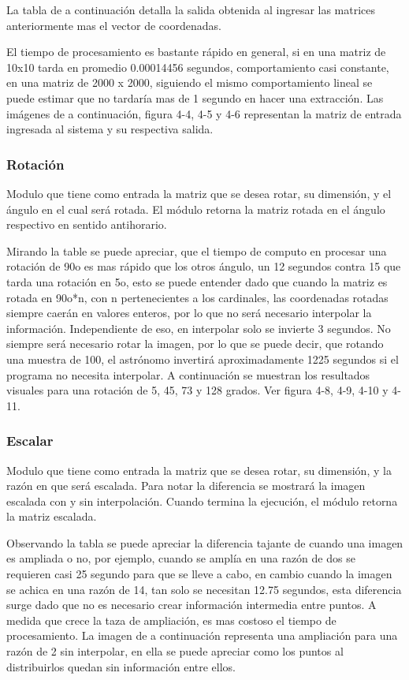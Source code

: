 La tabla de a continuación detalla la salida obtenida al ingresar las matrices
anteriormente mas el vector de coordenadas.

El tiempo de procesamiento es bastante rápido en general, si en una matriz de
10x10
tarda en promedio 0.00014456 segundos, comportamiento casi constante, en una
matriz
de 2000 x 2000, siguiendo el mismo comportamiento lineal se puede estimar que no
tardaría mas de 1 segundo en hacer una extracción.
Las imágenes de a continuación, figura 4-4, 4-5 y 4-6 representan la matriz de
entrada
ingresada al sistema y su respectiva salida.

\subsubsection{Rotación}

Modulo que tiene como entrada la matriz que se desea rotar, su dimensión, y el
ángulo en el cual será rotada. El módulo retorna la matriz rotada en el ángulo
respectivo en sentido antihorario.

Mirando la table se puede apreciar, que el tiempo de computo en procesar una
rotación de 90o es mas rápido que los otros ángulo, un 12 segundos contra 15 que
tarda una rotación en 5o, esto se puede entender dado que cuando la matriz es
rotada en 90o*n, con n pertenecientes a los cardinales, las coordenadas rotadas
siempre caerán en valores enteros, por lo que no será necesario interpolar la
información. Independiente de eso, en interpolar solo se invierte 3 segundos. No
siempre será necesario rotar la imagen, por lo que se puede decir, que rotando
una muestra de 100, el astrónomo invertirá aproximadamente 1225 segundos si
el programa no necesita interpolar.
A continuación se muestran los resultados visuales para una rotación de 5, 45,
73
y 128 grados. Ver figura 4-8, 4-9, 4-10 y 4-11.

\subsubsection{Escalar}
Modulo que tiene como entrada la matriz que se desea rotar, su dimensión, y la
razón en que será escalada. Para notar la diferencia se mostrará la imagen
escalada con y sin interpolación. Cuando termina la ejecución, el módulo retorna
la matriz escalada.

Observando la tabla se puede apreciar la diferencia tajante de cuando una imagen
es ampliada o no, por ejemplo, cuando se amplía en una razón de dos se
requieren casi 25 segundo para que se lleve a cabo, en cambio cuando la imagen
se achica en una razón de 1\/4, tan solo se necesitan 12.75 segundos, esta
diferencia surge dado que no es necesario crear información intermedia entre
puntos. A medida que crece la taza de ampliación, es mas costoso el tiempo de
procesamiento. La imagen de a continuación representa una ampliación para una
razón de 2 sin interpolar, en ella se puede apreciar como los puntos al
distribuirlos quedan sin información entre ellos.

